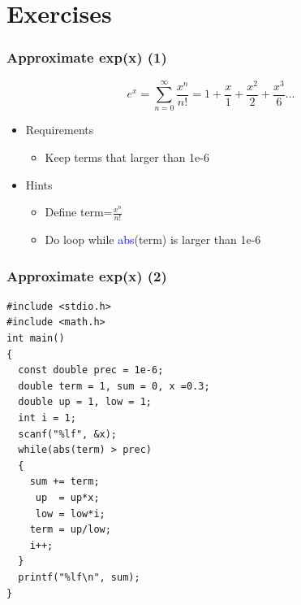 \section{Exercises}
\label{sec:exec}

\begin{frame}
\frametitle{Approximate exp(x) (1)}
\begin{equation}
	e^x=\sum_{n=0}^{\infty}\frac{x^n}{n!}=1+\frac{x}{1}+\frac{x^2}{2}+ \frac{x^3}{6}...
\end{equation}
\begin{itemize}
	\item {Requirements}
	\begin{itemize}
		\item {Keep terms that larger than 1e-6}
	\end{itemize}
	\item {Hints}
	\begin{itemize}
		\item {Define term=$\frac{x^n}{n!}$}
		\item {Do loop while \textcolor{blue}{abs}(term) is larger than 1e-6}
	\end{itemize}
\end{itemize}
\end{frame}

\ifx\answer\undefined
\begin{frame}[fragile]
\frametitle{Approximate exp(x) (2)}
\vspace{-0.15in}
\begin{lstlisting}[xleftmargin=0.08\linewidth, linewidth=0.9\linewidth]
#include <stdio.h>
#include <math.h>
int main()
{
  const double prec = 1e-6;
  double term = 1, sum = 0, x =0.3;
  double up = 1, low = 1;
  int i = 1;
  scanf("%lf", &x);
  while(abs(term) > prec)
  {
    sum += term;
     up  = up*x;
     low = low*i;
    term = up/low;
    i++;
  }
  printf("%lf\n", sum);
}
\end{lstlisting}
\end{frame}
\fi


